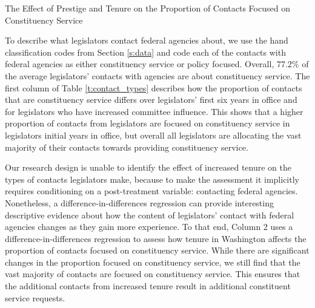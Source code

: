 \documentclass[12pt]{article}
\begin{document}
\begin{table}
\begin{center}
\begin{minipage}{\textwidth}
\caption{The Effect of Prestige and Tenure on the Proportion of Contacts Focused on Constituency Service} \label{t:contact_types}
\centering

\end{minipage}
\end{center}
\end{table}

To describe what legislators contact federal agencies about, we use the hand classification codes from Section \ref{s:data} and code each of the contacts with federal agencies as either constituency service or policy focused.  Overall, 77.2\% of the average legislators' contacts with agencies are about constituency service.  The first column of Table \ref{t:contact_types} describes how the proportion of contacts that are constituency service differs over legislators' first six years in office and for legislators who have increased committee influence. This shows that a higher proportion of contacts from legislators are focused on constituency service in legislators initial years in office, but overall all legislators are allocating the vast majority of their contacts towards providing constituency service. 

Our research design is unable to identify the effect of increased tenure on the types of contacts legislators make, because to make the assessment it implicitly requires conditioning on a post-treatment variable: contacting federal agencies.  Nonetheless, a difference-in-differences regression can provide interesting descriptive evidence about how the content of legislators' contact with federal agencies changes as they gain more experience.  To that end, Column 2 uses a difference-in-differences regression to assess how tenure in Washington affects the proportion of contacts focused on constituency service. While there are significant changes in the proportion focused on constituency service, we still find that the vast majority of contacts are focused on constituency service.  This ensures that the additional contacts from increased tenure result in additional constituent service requests. 
\end{document}
